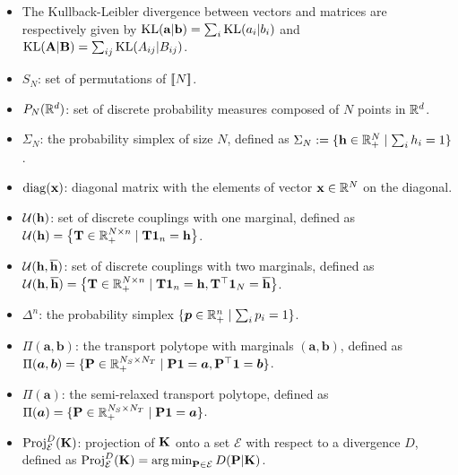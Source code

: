 \begin{itemize}
    \item The Kullback-Leibler divergence between vectors and matrices are respectively given by $\mathrm{KL}({\mathbf{a}} | {\mathbf{b}}) = \sum_{i} \mathrm{KL}(a_{i} | b_{i})$ and $\mathrm{KL}({\mathbf{A}} | {\mathbf{B}}) = \sum_{ij} \mathrm{KL}(A_{ij} | B_{ij})$.
    \item $S_N$: set of permutations of ${[\![N]\!]}$.
    \item $P_N(\mathbb{R}^d)$: set of discrete probability measures composed of $N$ points in $\mathbb{R}^d$.
    \item $\Sigma_N$: the probability simplex of size $N$, defined as $\Sigma_N := \{{\mathbf{h}} \in \mathbb{R}_+^N \mid \sum_i h_i = 1\}$.
    \item $\operatorname{diag}({\mathbf{x}})$: diagonal matrix with the elements of vector ${\mathbf{x}} \in \mathbb{R}^N$ on the diagonal.
    \item ${\mathcal{U}}({\mathbf{h}})$: set of discrete couplings with one marginal, defined as ${\mathcal{U}}({\mathbf{h}}) = \left\{ {\mathbf{T}} \in \mathbb{R}_+^{N \times n} \mid {\mathbf{T}} \mathbf{1}_n = {\mathbf{h}} \right\}$.
    \item ${\mathcal{U}}({\mathbf{h}}, \overline{{\mathbf{h}}})$: set of discrete couplings with two marginals, defined as ${\mathcal{U}}({\mathbf{h}}, \overline{{\mathbf{h}}}) = \left\{ {\mathbf{T}} \in \mathbb{R}_+^{N \times n} \mid {\mathbf{T}} \mathbf{1}_n = {\mathbf{h}}, {\mathbf{T}}^\top \mathbf{1}_N = \overline{{\mathbf{h}}} \right\}$.
    \item $\Delta^{n}$: the probability simplex $\{ \bm{p} \in \mathbb{R}_+^n \mid \sum_i p_i = 1 \}$.
    \item $\Pi(\bm{a}, \bm{b})$: the transport polytope with marginals $(\bm{a}, \bm{b})$, defined as $\Pi(\bm{a}, \bm{b}) = \{ {\mathbf{P}} \in \mathbb{R}_+^{N_S \times N_T} \mid {\mathbf{P}} \mathbf{1} = \bm{a}, {\mathbf{P}}^\top \mathbf{1} = \bm{b} \}$.
    \item $\Pi(\bm{a})$: the semi-relaxed transport polytope, defined as $\Pi(\bm{a}) = \{ {\mathbf{P}} \in \mathbb{R}_+^{N_S \times N_T} \mid {\mathbf{P}} \mathbf{1} = \bm{a} \}$.
    \item $\operatorname{Proj}^{D}_{\mathcal{E}}({\mathbf{K}})$: projection of ${\mathbf{K}}$ onto a set $\mathcal{E}$ with respect to a divergence $D$, defined as $\operatorname{Proj}^{D}_{\mathcal{E}}({\mathbf{K}})  =  \operatorname*{arg\,min}_{{\mathbf{P}} \in\mathcal{E}} D({\mathbf{P}} | {\mathbf{K}})$.
\end{itemize}